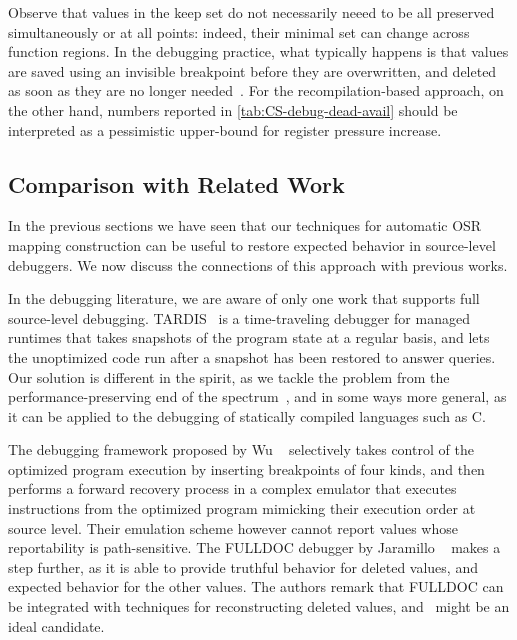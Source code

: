 Observe that values in the keep set do not necessarily neeed to be all preserved simultaneously or at all points: indeed, their minimal set can change across function regions. In the debugging practice, what typically happens is that values are saved using an invisible breakpoint before they are overwritten, and deleted as soon as they are no longer needed~\cite{Jaramillo00}. For the recompilation-based approach, on the other hand, numbers reported in \mytable\ref{tab:CS-debug-dead-avail} should be interpreted as a pessimistic upper-bound for register pressure increase.

\subsection{Comparison with Related Work}
In the previous sections we have seen that our techniques for automatic OSR mapping construction can be useful to restore expected behavior in source-level debuggers. We now discuss the connections of this approach with previous works.

In the debugging literature, we are aware of only one work that supports full source-level debugging. TARDIS~\cite{Barr14} is a time-traveling debugger for managed runtimes that takes snapshots of the program state at a regular basis, and lets the unoptimized code run after a snapshot has been restored to answer queries. Our solution is different in the spirit, as we tackle the problem from the performance-preserving end of the spectrum~\cite{Adl-Tabatabai96thesis}, and in some ways more general, as it can be applied to the debugging of statically compiled languages such as C.

The debugging framework proposed by Wu \etal~\cite{Wu99} selectively takes control of the optimized program execution by inserting breakpoints of four kinds, and then performs a forward recovery process in a complex emulator that executes instructions from the optimized program mimicking their execution order at source level. Their emulation scheme however cannot report values whose reportability is path-sensitive. The FULLDOC debugger by Jaramillo \etal~\cite{Jaramillo00} makes a step further, as it is able to provide truthful behavior for deleted values, and expected behavior for the other values. The authors remark that FULLDOC can be integrated with techniques for reconstructing deleted values, and \buildcomp\ might be an ideal candidate.

